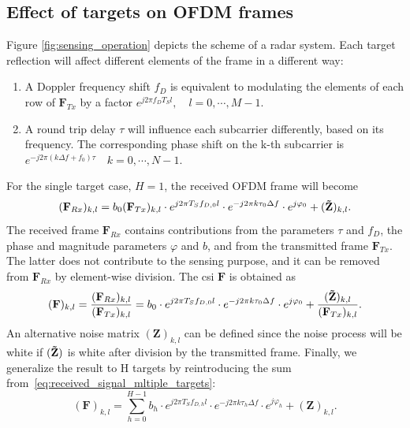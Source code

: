     \subsection{Effect of targets on OFDM frames}
    Figure \ref{fig:sensing_operation} depicts the scheme of a radar system.
    Each target reflection will affect different elements of the frame in a different way:
    \begin{enumerate}
        \item A Doppler frequency shift $f_D$ is equivalent to modulating the elements of each row of $\mathbf F_{Tx}$ by a factor $e^{j2\pi f_D T_S l},\quad  l = 0, \cdots, M-1$.
        \item A round trip delay $\tau$ will influence each subcarrier differently, based on its frequency. The corresponding phase shift on the k-th subcarrier is \\$e^{-j2\pi (k\Delta f + f_0)\tau} \quad  k = 0, \cdots, N-1$.
    \end{enumerate}
    For the single target case, $H=1$, the received OFDM frame will become
    \begin{equation}
        (\mathbf F_{Rx})_{k,l} = b_0(\mathbf F_{Tx})_{k,l} \cdot e^{j2\pi T_S f_{D,0} l}\cdot e^{-j2\pi k \tau_0 \Delta f} \cdot e^{j\varphi_0} + (\mathbf{\Tilde{Z}})_{k,l}.
    \end{equation}
    The received frame $\mathbf{F}_{Rx}$ contains contributions from the parameters $\tau$ and $f_D$, the phase and magnitude parameters $\varphi$ and $b$, and from the transmitted frame $\mathbf F_{Tx}$.
    The latter does not contribute to the sensing purpose, and it can be removed from $\mathbf F_{Rx}$ by element-wise division.
    The \gls{csi} $\mathbf F$ is obtained as
    \begin{equation}
        (\mathbf F)_{k,l} = \frac{(\mathbf F_{Rx})_{k,l}}{(\mathbf F_{Tx})_{k,l}} = b_0 \cdot e^{j2\pi T_S f_{D,0} l}\cdot e^{-j2\pi k \tau_0 \Delta f} \cdot e^{j\varphi_0} + \frac{(\mathbf{\Tilde{Z}})_{k,l}}{(\mathbf F_{Tx})_{k,l}}\label{eq:CSI_frame}.    
    \end{equation}
    An alternative noise matrix $(\mathbf{Z})_{k,l}$ can be defined since the noise process will be white if $(\mathbf{\Tilde{Z}})$ is white after division by the transmitted frame.
    Finally, we generalize the result to H targets by reintroducing the sum from~\eqref{eq:received_signal_mltiple_targets}:
    \begin{equation}
        (\mathbf F)_{k,l} =  \sum_{h=0}^{H-1} b_h \cdot e^{j2\pi T_S f_{D,h} l}\cdot e^{-j2\pi k \tau_h \Delta f} \cdot e^{j\varphi_h} + (\mathbf{Z})_{k,l}.
    \end{equation}
    
